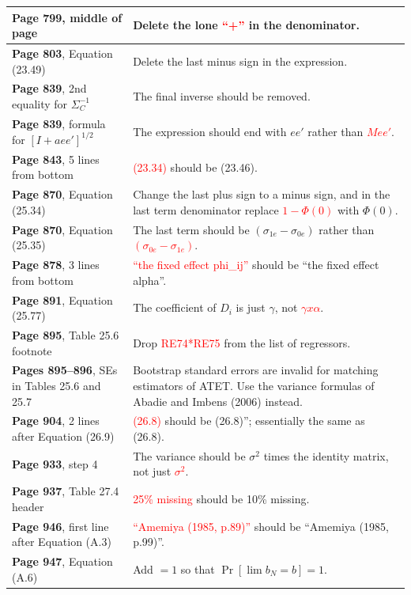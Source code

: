 \documentclass[10pt, a4paper]{article}
\newcommand{\red}[1]{\textcolor{red}{#1}}
\newcommand{\green}[1]{\textcolor{green!50!black}{#1}}
\begin{document}
\begin{longtable}{|R{.41\textwidth}|R{.57\textwidth}|}
	\textbf{Page 799}, middle of page & Delete the lone \red{``+''} in the denominator. \\ \hline
	\textbf{Page 803}, Equation (23.49) & Delete the last minus sign in the expression. \\ \hline
	\textbf{Page 839}, 2nd equality for $\Sigma_C^{-1}$ & The final inverse should be removed. \\ \hline
	\textbf{Page 839}, formula for $[I+aee']^{1/2}$ & The expression should end with \green{$ee'$} rather than \red{$Mee'$}. \\ \hline
	\textbf{Page 843}, 5 lines from bottom & \red{(23.34)} should be \green{(23.46)}. \\ \hline
	\textbf{Page 870}, Equation (25.34) & Change the last plus sign to a minus sign, and in the last term denominator replace \red{$1-\Phi(0)$} with \green{$\Phi(0)$}. \\ \hline
	\textbf{Page 870}, Equation (25.35) & The last term should be \green{$(\sigma_{1e}-\sigma_{0e})$} rather than \red{$(\sigma_{0e}-\sigma_{1e})$}. \\ \hline
	\textbf{Page 878}, 3 lines from bottom & \red{``the fixed effect phi\_ij''} should be \green{``the fixed effect alpha''}. \\ \hline
	\textbf{Page 891}, Equation (25.77) \hfill {} & The coefficient of \green{$D_i$} is just \green{$\gamma$}, not \red{$\gamma x \alpha$}. \\ \hline
	\textbf{Page 895}, Table 25.6 footnote & Drop \red{RE74*RE75} from the list of regressors. \\ \hline
	\textbf{Pages 895--896}, SEs in Tables 25.6 and 25.7 \hfill {} & Bootstrap standard errors are invalid for matching estimators of ATET. Use the variance formulas of \green{Abadie and Imbens (2006)} instead. \\ \hline
	\textbf{Page 904}, 2 lines after Equation (26.9) & \red{(26.8)} should be \green{(26.8)''}; essentially the same as (26.8). \\ \hline
	\textbf{Page 933}, step 4 & The variance should be \green{$\sigma^2$ times the identity matrix}, not just \red{$\sigma^2$}. \\ \hline
	\textbf{Page 937}, Table 27.4 header & \red{25\% missing} should be \green{10\% missing}. \\ \hline
	\textbf{Page 946}, first line after Equation (A.3) & \red{``Amemiya (1985, p.89)''} should be \green{``Amemiya (1985, p.99)''}. \\ \hline
	\textbf{Page 947}, Equation (A.6) & Add \green{$=1$} so that \green{$\Pr[\lim b_N=b]=1$}. \\ \hline

\end{longtable}
\end{document}
